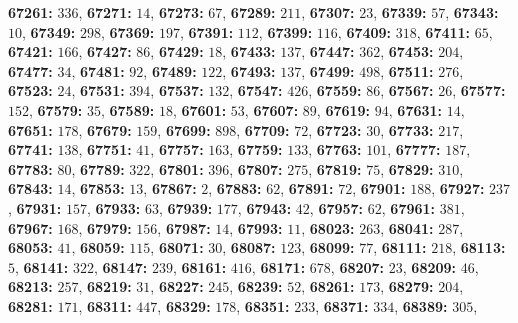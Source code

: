 \textsf{\bfseries 67261:} $336$, \textsf{\bfseries 67271:} $14$, \textsf{\bfseries 67273:} $67$, \textsf{\bfseries 67289:} $211$, \textsf{\bfseries 67307:} $23$, \textsf{\bfseries 67339:} $57$, \textsf{\bfseries 67343:} $10$, \textsf{\bfseries 67349:} $298$, \textsf{\bfseries 67369:} $197$, \textsf{\bfseries 67391:} $112$, \textsf{\bfseries 67399:} $116$, \textsf{\bfseries 67409:} $318$, \textsf{\bfseries 67411:} $65$, \textsf{\bfseries 67421:} $166$, \textsf{\bfseries 67427:} $86$, \textsf{\bfseries 67429:} $18$, \textsf{\bfseries 67433:} $137$, \textsf{\bfseries 67447:} $362$, \textsf{\bfseries 67453:} $204$, \textsf{\bfseries 67477:} $34$, \textsf{\bfseries 67481:} $92$, \textsf{\bfseries 67489:} $122$, \textsf{\bfseries 67493:} $137$, \textsf{\bfseries 67499:} $498$, \textsf{\bfseries 67511:} $276$, \textsf{\bfseries 67523:} $24$, \textsf{\bfseries 67531:} $394$, \textsf{\bfseries 67537:} $132$, \textsf{\bfseries 67547:} $426$, \textsf{\bfseries 67559:} $86$, \textsf{\bfseries 67567:} $26$, \textsf{\bfseries 67577:} $152$, \textsf{\bfseries 67579:} $35$, \textsf{\bfseries 67589:} $18$, \textsf{\bfseries 67601:} $53$, \textsf{\bfseries 67607:} $89$, \textsf{\bfseries 67619:} $94$, \textsf{\bfseries 67631:} $14$, \textsf{\bfseries 67651:} $178$, \textsf{\bfseries 67679:} $159$, \textsf{\bfseries 67699:} $898$, \textsf{\bfseries 67709:} $72$, \textsf{\bfseries 67723:} $30$, \textsf{\bfseries 67733:} $217$, \textsf{\bfseries 67741:} $138$, \textsf{\bfseries 67751:} $41$, \textsf{\bfseries 67757:} $163$, \textsf{\bfseries 67759:} $133$, \textsf{\bfseries 67763:} $101$, \textsf{\bfseries 67777:} $187$, \textsf{\bfseries 67783:} $80$, \textsf{\bfseries 67789:} $322$, \textsf{\bfseries 67801:} $396$, \textsf{\bfseries 67807:} $275$, \textsf{\bfseries 67819:} $75$, \textsf{\bfseries 67829:} $310$, \textsf{\bfseries 67843:} $14$, \textsf{\bfseries 67853:} $13$, \textsf{\bfseries 67867:} $2$, \textsf{\bfseries 67883:} $62$, \textsf{\bfseries 67891:} $72$, \textsf{\bfseries 67901:} $188$, \textsf{\bfseries 67927:} $237$, \textsf{\bfseries 67931:} $157$, \textsf{\bfseries 67933:} $63$, \textsf{\bfseries 67939:} $177$, \textsf{\bfseries 67943:} $42$, \textsf{\bfseries 67957:} $62$, \textsf{\bfseries 67961:} $381$, \textsf{\bfseries 67967:} $168$, \textsf{\bfseries 67979:} $156$, \textsf{\bfseries 67987:} $14$, \textsf{\bfseries 67993:} $11$, \textsf{\bfseries 68023:} $263$, \textsf{\bfseries 68041:} $287$, \textsf{\bfseries 68053:} $41$, \textsf{\bfseries 68059:} $115$, \textsf{\bfseries 68071:} $30$, \textsf{\bfseries 68087:} $123$, \textsf{\bfseries 68099:} $77$, \textsf{\bfseries 68111:} $218$, \textsf{\bfseries 68113:} $5$, \textsf{\bfseries 68141:} $322$, \textsf{\bfseries 68147:} $239$, \textsf{\bfseries 68161:} $416$, \textsf{\bfseries 68171:} $678$, \textsf{\bfseries 68207:} $23$, \textsf{\bfseries 68209:} $46$, \textsf{\bfseries 68213:} $257$, \textsf{\bfseries 68219:} $31$, \textsf{\bfseries 68227:} $245$, \textsf{\bfseries 68239:} $52$, \textsf{\bfseries 68261:} $173$, \textsf{\bfseries 68279:} $204$, \textsf{\bfseries 68281:} $171$, \textsf{\bfseries 68311:} $447$, \textsf{\bfseries 68329:} $178$, \textsf{\bfseries 68351:} $233$, \textsf{\bfseries 68371:} $334$, \textsf{\bfseries 68389:} $305$, 
